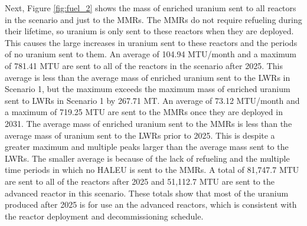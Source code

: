 Next, Figure \ref{fig:fuel_2} shows the mass of enriched uranium sent to all 
reactors in the scenario and just to the \glspl{MMR}. The \glspl{MMR} 
do not require refueling during their lifetime, so uranium is only 
sent to these reactors when they are deployed. This causes the 
large increases in uranium sent to these reactors and the periods of 
no uranium sent to them. An average of 104.94 MTU/month and a maximum 
of 781.41 MTU are sent to all of the reactors in the scenario after 2025. 
This average is less than the average mass of enriched uranium 
sent to the \glspl{LWR} in Scenario 1, but the maximum exceeds the maximum 
mass of enriched uranium sent to \glspl{LWR} in Scenario 1 by 267.71 MT.
An average of 73.12 MTU/month and a maximum of 719.25 
MTU are sent to the \glspl{MMR} once they are deployed in 2031. The average 
mass of enriched uranium sent to the 
\glspl{MMR} is less than the average mass of uranium sent to the \glspl{LWR}
prior to 2025. This is despite a greater maximum and multiple peaks larger
than the
average mass sent to the \glspl{LWR}. The smaller average is because of the 
lack of refueling and the multiple time periods in 
which no \gls{HALEU} is sent to the \glspl{MMR}.
A total of 81,747.7 MTU are sent to all of the reactors after 2025 and 
51,112.7 MTU are sent to the advanced reactor in this 
scenario. These totals show that most of the uranium produced after 2025 is 
for use an the advanced reactors, which is consistent with the reactor 
deployment and decommissioning schedule. 

